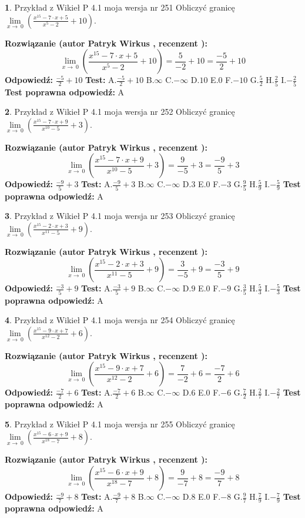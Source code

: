 \documentclass[12pt, a4paper]{article}
\theoremstyle{definition} %
\newtheorem{zad}{}
\newcommand{\zadStart}[1]{\begin{zad}#1\newline}
\newcommand{\zadStop}{\end{zad}}
\newcommand{\rozwStart}[2]{\noindent \textbf{Rozwiązanie (autor #1 , recenzent #2): }\newline}
\newcommand{\rozwStop}{\newline}
\newcommand{\odpStart}{\noindent \textbf{Odpowiedź:}\newline}
\newcommand{\odpStop}{\newline}
\newcommand{\testStart}{\noindent \textbf{Test:}\newline}
\newcommand{\testStop}{\newline}
\newcommand{\kluczStart}{\noindent \textbf{Test poprawna odpowiedź:}\newline}
\newcommand{\kluczStop}{\newline}
\begin{document}
\zadStart{Przykład z Wikieł P 4.1 moja wersja nr 251}
Obliczyć granicę $\lim\limits_{x\to\ 0}(\frac{x^{15}-7 \cdot x +5}{x^{5}-2}+10)$.
\zadStop
\rozwStart{Patryk Wirkus}{}
$$\lim\limits_{x\to\ 0}(\frac{x^{15}-7 \cdot x +5}{x^{5}-2}+10)=\frac{5}{-2}+10=\frac{-5}{2}+10$$
\rozwStop
\odpStart
$\frac{-5}{2}+10$
\odpStop
\testStart
A.$\frac{-5}{2}+10$
B.$\infty$
C.$-\infty$
D.$10$
E.$0$
F.$-10$
G.$\frac{5}{2}$
H.$\frac{2}{5}$
I.$-\frac{2}{5}$
\testStop
\kluczStart
A
\kluczStop



\zadStart{Przykład z Wikieł P 4.1 moja wersja nr 252}
Obliczyć granicę $\lim\limits_{x\to\ 0}(\frac{x^{15}-7 \cdot x +9}{x^{10}-5}+3)$.
\zadStop
\rozwStart{Patryk Wirkus}{}
$$\lim\limits_{x\to\ 0}(\frac{x^{15}-7 \cdot x +9}{x^{10}-5}+3)=\frac{9}{-5}+3=\frac{-9}{5}+3$$
\rozwStop
\odpStart
$\frac{-9}{5}+3$
\odpStop
\testStart
A.$\frac{-9}{5}+3$
B.$\infty$
C.$-\infty$
D.$3$
E.$0$
F.$-3$
G.$\frac{9}{5}$
H.$\frac{5}{9}$
I.$-\frac{5}{9}$
\testStop
\kluczStart
A
\kluczStop



\zadStart{Przykład z Wikieł P 4.1 moja wersja nr 253}
Obliczyć granicę $\lim\limits_{x\to\ 0}(\frac{x^{15}-2 \cdot x +3}{x^{11}-5}+9)$.
\zadStop
\rozwStart{Patryk Wirkus}{}
$$\lim\limits_{x\to\ 0}(\frac{x^{15}-2 \cdot x +3}{x^{11}-5}+9)=\frac{3}{-5}+9=\frac{-3}{5}+9$$
\rozwStop
\odpStart
$\frac{-3}{5}+9$
\odpStop
\testStart
A.$\frac{-3}{5}+9$
B.$\infty$
C.$-\infty$
D.$9$
E.$0$
F.$-9$
G.$\frac{3}{5}$
H.$\frac{5}{3}$
I.$-\frac{5}{3}$
\testStop
\kluczStart
A
\kluczStop



\zadStart{Przykład z Wikieł P 4.1 moja wersja nr 254}
Obliczyć granicę $\lim\limits_{x\to\ 0}(\frac{x^{15}-9 \cdot x +7}{x^{12}-2}+6)$.
\zadStop
\rozwStart{Patryk Wirkus}{}
$$\lim\limits_{x\to\ 0}(\frac{x^{15}-9 \cdot x +7}{x^{12}-2}+6)=\frac{7}{-2}+6=\frac{-7}{2}+6$$
\rozwStop
\odpStart
$\frac{-7}{2}+6$
\odpStop
\testStart
A.$\frac{-7}{2}+6$
B.$\infty$
C.$-\infty$
D.$6$
E.$0$
F.$-6$
G.$\frac{7}{2}$
H.$\frac{2}{7}$
I.$-\frac{2}{7}$
\testStop
\kluczStart
A
\kluczStop



\zadStart{Przykład z Wikieł P 4.1 moja wersja nr 255}
Obliczyć granicę $\lim\limits_{x\to\ 0}(\frac{x^{15}-6 \cdot x +9}{x^{18}-7}+8)$.
\zadStop
\rozwStart{Patryk Wirkus}{}
$$\lim\limits_{x\to\ 0}(\frac{x^{15}-6 \cdot x +9}{x^{18}-7}+8)=\frac{9}{-7}+8=\frac{-9}{7}+8$$
\rozwStop
\odpStart
$\frac{-9}{7}+8$
\odpStop
\testStart
A.$\frac{-9}{7}+8$
B.$\infty$
C.$-\infty$
D.$8$
E.$0$
F.$-8$
G.$\frac{9}{7}$
H.$\frac{7}{9}$
I.$-\frac{7}{9}$
\testStop
\kluczStart
A
\kluczStop
\end{document}

